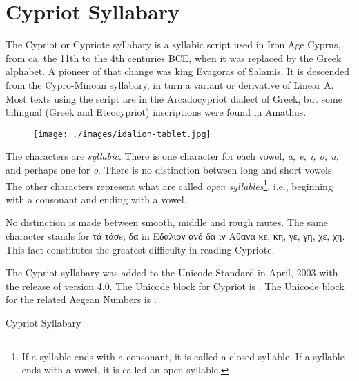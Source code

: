 \section{Cypriot Syllabary}
\label{s:cypriot}
The Cypriot or Cypriote syllabary is a syllabic script used in Iron Age Cyprus, from ca. the 11th to the 4th centuries BCE, when it was replaced by the Greek alphabet. A pioneer of that change was king Evagoras of Salamis. It is descended from the Cypro-Minoan syllabary, in turn a variant or derivative of Linear A. Most texts using the script are in the Arcadocypriot dialect of Greek, but some bilingual (Greek and Eteocypriot) inscriptions were found in Amathus.

\begin{figure}[htb]
\centering
\begin{minipage}{7cm}
\texttt{[image: ./images/idalion-tablet.jpg]}
\end{minipage}\hspace{1.5em}
\begin{minipage}{6cm}
\end{minipage}
\end{figure}


The characters are \textit{syllabic}. There is one character for each  vowel, \textit{a, e, i, o, u,} and perhaps one for \textit{o}. There is no distinction between long and short vowels. The other characters represent what are called \textit{open syllables}\footnote{ If a syllable ends with a consonant, it is called a closed syllable. If a syllable ends with a vowel, it is called an open syllable. }, i.e., beginning with a consonant and ending with a vowel. 

No distinction is made between smooth, middle and rough mutes. The same character stands for τά τ\'ασs, δα in Εδαλιον ανδ δα ιν Αθανα  κε, κη, γε, γη, χε, χη. This fact constitutes the greatest difficulty in reading Cypriote.  

The Cypriot syllabary was added to the Unicode Standard in April, 2003 with the release of version 4.0.
The Unicode block for Cypriot is . The Unicode block for the related Aegean Numbers is .

\newfontfamily{}

\begin{scriptexample}[]{Cypriot Syllabary}

\cypriote {}
\end{scriptexample}


